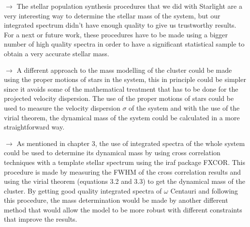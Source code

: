 $\rightarrow$ The stellar population synthesis procedures that we did with Starlight are a very interesting way to determine the stellar mass of the system, but our integrated spectrum didn't have enough quality to give us trustworthy results. For a next or future work, these procedures have to be made using a bigger number of high quality spectra in order to have a significant statistical sample to obtain a very accurate stellar mass.

$\rightarrow$ A different approach to the mass modelling of the cluster could be made using the proper motions of stars in the system, this in principle could be simpler since it avoids some of the mathematical treatment that has to be done for the projected velocity dispersion. The use of the proper motions of stars could be used to measure the velocity dispersion $\sigma$ of the system and with the use of the virial theorem, the dynamical mass of the system could be calculated in a more straightforward way.

$\rightarrow$ As mentioned in chapter 3, the use of integrated spectra of the whole system could be used to determine its dynamical mass by using cross correlation techniques with a template stellar spectrum using the iraf package FXCOR. This procedure is made by measuring the FWHM of the cross correlation results and using the virial theorem (equations 3.2 and 3.3) to get the dynamical mass of the cluster. By getting good quality integrated spectra of $\omega$ Centauri and following this procedure, the mass determination would be made by another different method that would allow the model to be more robust with different constraints that improve the results.

